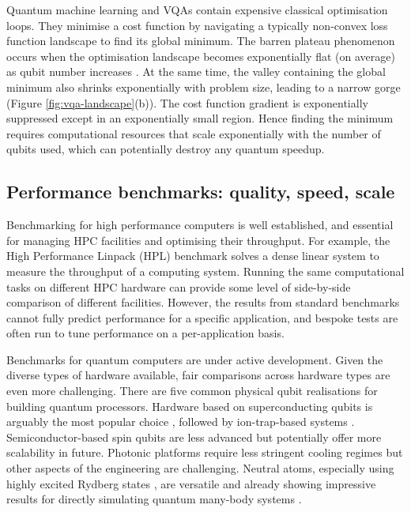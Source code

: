 \documentclass[10pt]{iopart}
\begin{document}
Quantum machine learning and VQAs contain expensive classical optimisation loops. They minimise a cost function by navigating a typically non-convex loss function landscape to find its global minimum. The barren plateau phenomenon occurs when the optimisation landscape becomes exponentially flat (on average) as qubit number increases \cite{McClean2018,Cerezo2021}. At the same time, the valley containing the global minimum also shrinks exponentially with problem size, leading to a narrow gorge \cite{Arrasmith2022} (Figure \ref{fig:vqa-landscape}(b)). The cost function gradient is exponentially suppressed except in an exponentially small region. Hence finding the minimum requires computational resources that scale exponentially with the number of qubits used, which can potentially destroy any quantum speedup.


\subsection{Performance benchmarks: quality, speed, scale}\label{ssec:benchmark}

Benchmarking for high performance computers is well established, and essential for managing HPC facilities and optimising their throughput. For example, the High Performance Linpack (HPL) benchmark \cite{Petitet2018} solves a dense linear system to measure the throughput of a computing system. Running the same computational tasks on different HPC hardware can provide some level of side-by-side comparison of different facilities. However, the results from standard benchmarks cannot fully predict performance for a specific application, and bespoke tests are often run to tune performance on a per-application basis.

Benchmarks for quantum computers are under active development. Given the diverse types of hardware available, fair comparisons across hardware types are even more challenging. There are five common physical qubit realisations for building quantum processors. Hardware based on superconducting qubits \cite{Krantz2019,Blais2021} is arguably the most popular choice \cite{Kjaergaard2020,Bravyi2022,Blais2020}, followed by ion-trap-based systems \cite{Bruzewicz2019,Malinowski2023,Moses2023}. Semiconductor-based spin qubits \cite{Chatterjee2021,Burkhard2023} are less advanced but potentially offer more scalability in future. Photonic platforms \cite{Pelucci2022,Moody2022} require less stringent cooling regimes but other aspects of the engineering are challenging. Neutral atoms, especially using highly excited Rydberg states \cite{Adams2020}, are versatile and already showing impressive results for directly simulating quantum many-body systems \cite{Surace2020,Ebadi2021}.
\end{document}

